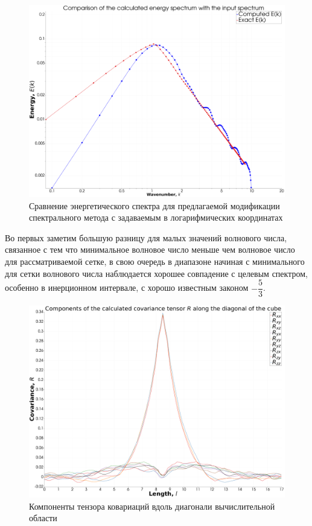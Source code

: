 \begin{figure}[ht] 
    \center
    \includegraphics [width=0.8\linewidth] {images/spectral/spectra_l10_k10_f1000_n51_loglog.png}
    \caption{Сравнение энергетического спектра для предлагаемой модификации спектрального метода с задаваемым в логарифмических координатах} 
    \label{img:spectral_desam_spectra_comparison}  
\end{figure}

Во первых заметим большую разницу для малых значений волнового числа, связанное с тем что минимальное волновое число меньше чем волновое число для рассматриваемой сетке, в свою очередь в диапазоне начиная с минимального для сетки волнового числа наблюдается хорошее совпадение с целевым спектром, особенно в инерционном интервале, с хорошо известным законом $-\dfrac{5}{3}$.
  
\begin{figure}[ht] 
    \center
    \includegraphics [width=0.8\linewidth] {images/spectral/covariance_function_tensor.png}
    \caption{Компоненты тензора ковариаций вдоль диагонали вычислительной области} 
    \label{img:spectral_desam_covariance_comarison}  
\end{figure}

